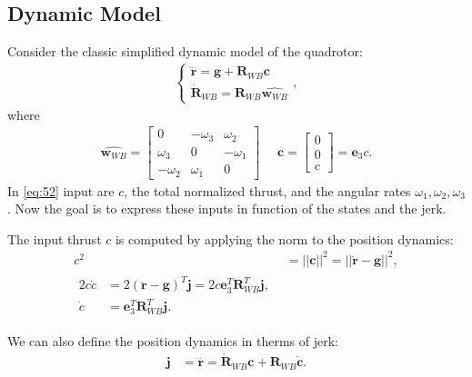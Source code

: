 \subsection{Dynamic Model}
Consider the classic simplified dynamic model of the quadrotor:
\begin{align}
\begin{cases}
\ddot{\boldsymbol{r}} = \boldsymbol{g} + \boldsymbol{R}_{WB}\boldsymbol{c}  \\[10pt]
\dot{\boldsymbol{R}}_{WB} = \boldsymbol{R}_{WB}\hat{\boldsymbol{w}_{WB}}
\end{cases},
\label{eq:dynamic_jerk}
\end{align}
where 
\begin{align}
\hat{\boldsymbol{w}_{WB}} =
{\begin{bmatrix}
0 & -\omega_3 & \omega_2 \\[10pt]
\omega_3 & 0 & -\omega_1 \\[10pt]
-\omega_2 & \omega_1  & 0
\end{bmatrix}} \ \ \ \ \ \ \boldsymbol{c} = 
{\begin{bmatrix}
0 \\[10pt]
0 \\[10pt]
c
\end{bmatrix}} = \boldsymbol{e}_3c.
\label{eq:52}
\end{align}
In \eqref{eq:52} input are  $c$, the total normalized thrust, and the angular rates $\omega_1,\omega_2,\omega_3$. Now the goal is to express these inputs in function of the states and the jerk.
 
The input thrust $c$ is computed by applying the norm to the position dynamics:
\begin{align}
c^2 &= ||\boldsymbol{c}||^2 =  ||\ddot{\boldsymbol{r}} - \boldsymbol{g}||^2, \\[20pt] \label{eq:thrust_from_jerk}
\begin{split}
2c\dot{c} &= 2(\ddot{\boldsymbol{r}} - \boldsymbol{g})^T \boldsymbol{j} = 2 c\boldsymbol{e}_3^T\boldsymbol{R}_{WB}^T \boldsymbol{j}  , \\[10pt]
\dot{c} &= \boldsymbol{e}_3^T\boldsymbol{R}_{WB}^T \boldsymbol{j} .
\end{split}
\end{align}

We can also define the position dynamics in therms of jerk:
\begin{align}
\boldsymbol{j} &= \dddot{\boldsymbol{r}} = \dot{\boldsymbol{R}}_{WB}\boldsymbol{c} + \boldsymbol{R}_{WB}\dot{\boldsymbol{c}}.
\end{align}

